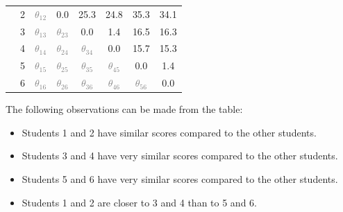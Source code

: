 \begin{boxedstuff}
\begin{example}
\begin{small}
\begin{center}
\begin{tabular}{lc|cccccc|}
                \multicolumn{1}{|l|}{} & 2 & \multicolumn{1}{c|}{\textcolor{gray}{$\theta_{12}$}} & \multicolumn{1}{c|}{0.0} & \multicolumn{1}{c|}{25.3} & \multicolumn{1}{c|}{24.8} & \multicolumn{1}{c|}{35.3} & 34.1 \\ \cline{2-8} 
                \multicolumn{1}{|l|}{} & 3 & \multicolumn{1}{c|}{\textcolor{gray}{$\theta_{13}$}} & \multicolumn{1}{c|}{\textcolor{gray}{$\theta_{23}$}} & \multicolumn{1}{c|}{0.0} & \multicolumn{1}{c|}{1.4} & \multicolumn{1}{c|}{16.5} & 16.3 \\ \cline{2-8} 
                \multicolumn{1}{|l|}{} & 4 & \multicolumn{1}{c|}{\textcolor{gray}{$\theta_{14}$}} & \multicolumn{1}{c|}{\textcolor{gray}{$\theta_{24}$}} & \multicolumn{1}{c|}{\textcolor{gray}{$\theta_{34}$}} & \multicolumn{1}{c|}{0.0} & \multicolumn{1}{c|}{15.7} & 15.3 \\ \cline{2-8} 
                \multicolumn{1}{|l|}{} & 5 & \multicolumn{1}{c|}{\textcolor{gray}{$\theta_{15}$}} & \multicolumn{1}{c|}{\textcolor{gray}{$\theta_{25}$}} & \multicolumn{1}{c|}{\textcolor{gray}{$\theta_{35}$}} & \multicolumn{1}{c|}{\textcolor{gray}{$\theta_{45}$}} & \multicolumn{1}{c|}{0.0} & 1.4 \\ \cline{2-8} 
                \multicolumn{1}{|l|}{} & 6 & \multicolumn{1}{c|}{\textcolor{gray}{$\theta_{16}$}} & \multicolumn{1}{c|}{\textcolor{gray}{$\theta_{26}$}} & \multicolumn{1}{c|}{\textcolor{gray}{$\theta_{36}$}} & \multicolumn{1}{c|}{\textcolor{gray}{$\theta_{46}$}} & \multicolumn{1}{c|}{\textcolor{gray}{$\theta_{56}$}} & 0.0 \\ \hline
                \end{tabular}
            \end{center}
        \end{small}
        
        \noindent The following observations can be made from the table:
        \begin{itemize}
            \item Students 1 and 2 have similar scores compared to the other students.
            \item Students 3 and 4 have very similar scores compared to the other students.
            \item Students 5 and 6 have very similar scores compared to the other students.
            \item Students 1 and 2 are closer to 3 and 4 than to 5 and 6.
        \end{itemize}


\end{example}
\end{boxedstuff}

